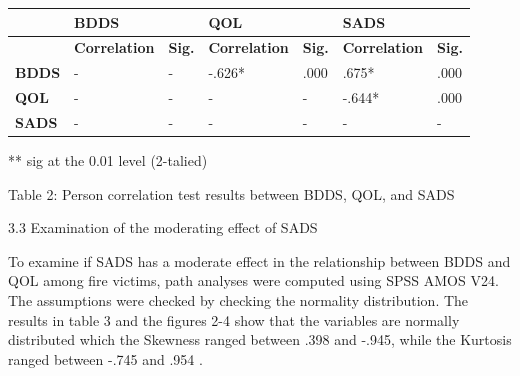 \documentclass[10pt]{NSP1}
\makeatletter
\newcommand\jltx@wideopen{\par\addvspace{\medskipamount}\noindent}
\newcommand\jltx@wideclose{\par\addvspace{\medskipamount}}
\newenvironment{jltxspan}
  {\if@twocolumn\let\jltx@spannext\strip\else\let\jltx@spannext\jltx@wideopen\fi\jltx@spannext}
  {\if@twocolumn\let\jltx@spanend\endstrip\else\let\jltx@spanend\jltx@wideclose\fi\jltx@spanend}
\newcommand\JLTXaboveplacement{\par\addvspace{6pt plus 2pt minus 2pt}\noindent}
\newcommand\JLTXbelowplacement{\par\addvspace{6pt plus 2pt minus 2pt}}
\makeatother
\begin{document}
\JLTXaboveplacement \begin{jltxspan}%
\noindent\begin{minipage}{\linewidth}%
\centering
{\small
\begin{tabular}{|>{\centering\arraybackslash}p{}|>{\centering\arraybackslash}p{}|>{\centering\arraybackslash}p{}|>{\centering\arraybackslash}p{}|>{\centering\arraybackslash}p{}|>{\centering\arraybackslash}p{}|>{\centering\arraybackslash}p{}|}
\hline
\multirow{2}{*}{\cellcolor[HTML]{DDD9C3}\textbf{Variable}} & \cellcolor[HTML]{DDD9C3}\textbf{BDDS} & \cellcolor[HTML]{DDD9C3} & \cellcolor[HTML]{DDD9C3}\textbf{QOL} & \cellcolor[HTML]{DDD9C3} & \cellcolor[HTML]{DDD9C3}\textbf{SADS} & \cellcolor[HTML]{DDD9C3} \\
\cline{2-7}
 & \cellcolor[HTML]{DDD9C3}\textbf{Correlation} & \cellcolor[HTML]{DDD9C3}\textbf{Sig.} & \cellcolor[HTML]{DDD9C3}\textbf{Correlation} & \cellcolor[HTML]{DDD9C3}\textbf{Sig.} & \cellcolor[HTML]{DDD9C3}\textbf{Correlation} & \cellcolor[HTML]{DDD9C3}\textbf{Sig.} \\
\hline
\cellcolor[HTML]{DDD9C3}\textbf{BDDS} & - & - & -.626* & .000 & .675* & .000 \\
\hline
\cellcolor[HTML]{DDD9C3}\textbf{QOL} & - & - & - & - & -.644* & .000 \\
\hline
\cellcolor[HTML]{DDD9C3}\textbf{SADS} & - & - & - & - & - & - \\
\hline
\end{tabular}}
%
\end{minipage}%
\end{jltxspan}\JLTXbelowplacement 

** sig at the 0.01 level (2-talied)

Table 2: Person correlation test results between BDDS, QOL, and SADS

3.3 Examination of the moderating effect of SADS

To examine if SADS has a moderate effect in the relationship between BDDS and QOL among fire victims, path analyses were computed using SPSS AMOS V24. The assumptions were checked by checking the normality distribution. The results in table 3 and the figures 2-4 show that the variables are normally distributed which the Skewness ranged between .398 and -.945, while the Kurtosis ranged between -.745 and .954 \cite{ref16}.
\end{document}
